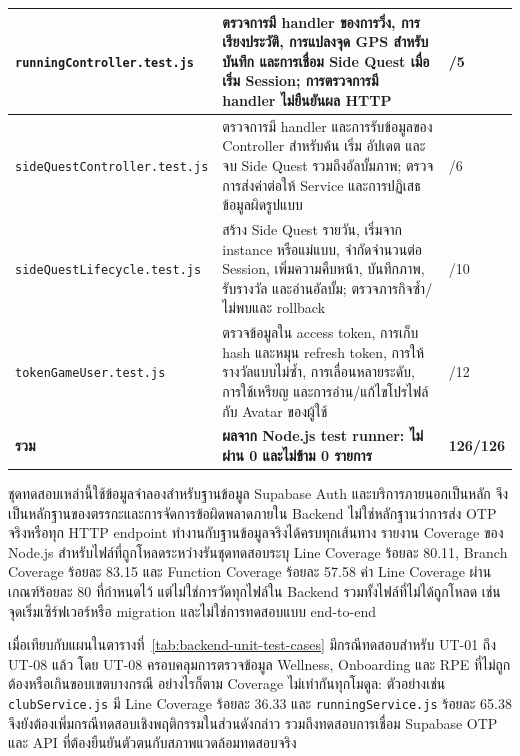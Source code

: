 \begin{longtable}{|>{\raggedright\arraybackslash}p{}|>{\raggedright\arraybackslash}p{}|>{\centering\arraybackslash}p{}|}
\texttt{running}\newline\texttt{Controller}\newline\texttt{.test.js} & ตรวจการมี handler ของการวิ่ง, การเรียงประวัติ, การแปลงจุด GPS สำหรับบันทึก และการเชื่อม Side Quest เมื่อเริ่ม Session; การตรวจการมี handler ไม่ยืนยันผล HTTP & 5/5 \\ \hline
\texttt{sideQuest}\newline\texttt{Controller}\newline\texttt{.test.js} & ตรวจการมี handler และการรับข้อมูลของ Controller สำหรับค้น เริ่ม อัปเดต และจบ Side Quest รวมถึงอัลบั้มภาพ; ตรวจการส่งค่าต่อให้ Service และการปฏิเสธข้อมูลผิดรูปแบบ & 6/6 \\ \hline
\texttt{sideQuest}\newline\texttt{Lifecycle}\newline\texttt{.test.js} & สร้าง Side Quest รายวัน, เริ่มจาก instance หรือแม่แบบ, จำกัดจำนวนต่อ Session, เพิ่มความคืบหน้า, บันทึกภาพ, รับรางวัล และอ่านอัลบั้ม; ตรวจภารกิจซ้ำ/ไม่พบและ rollback & 10/10 \\ \hline
\texttt{tokenGame}\newline\texttt{User.test.js} & ตรวจข้อมูลใน access token, การเก็บ hash และหมุน refresh token, การให้รางวัลแบบไม่ซ้ำ, การเลื่อนหลายระดับ, การใช้เหรียญ และการอ่าน/แก้ไขโปรไฟล์กับ Avatar ของผู้ใช้ & 12/12 \\ \hline
\textbf{รวม} & \textbf{ผลจาก Node.js test runner: ไม่ผ่าน 0 และไม่ข้าม 0 รายการ} & \textbf{126/126} \\ \hline
\end{longtable}
\endgroup

ชุดทดสอบเหล่านี้ใช้ข้อมูลจำลองสำหรับฐานข้อมูล Supabase Auth และบริการภายนอกเป็นหลัก จึงเป็นหลักฐานของตรรกะและการจัดการข้อผิดพลาดภายใน Backend ไม่ใช่หลักฐานว่าการส่ง OTP จริงหรือทุก HTTP endpoint ทำงานกับฐานข้อมูลจริงได้ครบทุกเส้นทาง รายงาน Coverage ของ Node.js สำหรับไฟล์ที่ถูกโหลดระหว่างรันชุดทดสอบระบุ Line Coverage ร้อยละ 80.11, Branch Coverage ร้อยละ 83.15 และ Function Coverage ร้อยละ 57.58 ค่า Line Coverage ผ่านเกณฑ์ร้อยละ 80 ที่กำหนดไว้ แต่ไม่ใช่การวัดทุกไฟล์ใน Backend รวมทั้งไฟล์ที่ไม่ได้ถูกโหลด เช่น จุดเริ่มเซิร์ฟเวอร์หรือ migration และไม่ใช่การทดสอบแบบ end-to-end

เมื่อเทียบกับแผนในตารางที่~\ref{tab:backend-unit-test-cases} มีกรณีทดสอบสำหรับ UT-01 ถึง UT-08 แล้ว โดย UT-08 ครอบคลุมการตรวจข้อมูล Wellness, Onboarding และ RPE ที่ไม่ถูกต้องหรือเกินขอบเขตบางกรณี อย่างไรก็ตาม Coverage ไม่เท่ากันทุกโมดูล: ตัวอย่างเช่น \texttt{clubService.js} มี Line Coverage ร้อยละ 36.33 และ \texttt{runningService.js} ร้อยละ 65.38 จึงยังต้องเพิ่มกรณีทดสอบเชิงพฤติกรรมในส่วนดังกล่าว รวมถึงทดสอบการเชื่อม Supabase OTP และ API ที่ต้องยืนยันตัวตนกับสภาพแวดล้อมทดสอบจริง

